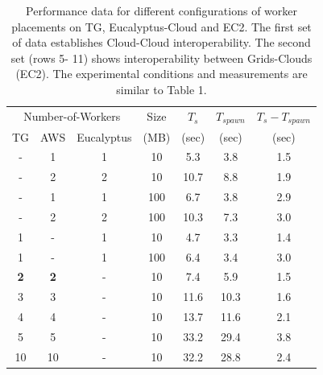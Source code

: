 \documentclass[3p,twocolumn]{elsarticle}
\newcommand{\upp}{\vspace*{-0.6em}}
\begin{document}
\begin{table}
\upp
\begin{tabular}{ccccccc}
  \hline
  \multicolumn{3}{c}{Number-of-Workers}  &  Size   &  $T_s$  & $T_{spawn}$ & $T_s - T_{spawn}$\\   
  TG &  AWS & Eucalyptus &  (MB)  & (sec) & (sec) & (sec) \\
  \hline
  - & 1 & 1 & 10   & 5.3 & 3.8 & 1.5\\
  - & 2 & 2 & 10   & 10.7 & 8.8 & 1.9 \\
  - & 1 & 1 & 100  & 6.7 & 3.8 & 2.9\\
  - & 2 & 2 & 100  & 10.3 & 7.3 & 3.0\\
  \hline 
  1 & - & 1 & 10   & 4.7 & 3.3 & 1.4\\
  1 & - & 1 & 100  & 6.4 & 3.4 & 3.0\\
  \hline 
  {\bf 2} &   {\bf 2} & - & 10 & 7.4 & 5.9 & 1.5 \\
  3 & 3 & - & 10 & 11.6 & 10.3 & 1.6 \\
  4 & 4 & - & 10 & 13.7 & 11.6 & 2.1 \\
  5 & 5 & - & 10 & 33.2 & 29.4 & 3.8 \\ 
  10 & 10 & - & 10 & 32.2 & 28.8 & 2.4 \\
  \hline
   \hline 
\end{tabular}
\upp
\caption{Performance data for different configurations of worker placements
  on TG, Eucalyptus-Cloud and EC2. The first set of data
  establishes Cloud-Cloud interoperability. The second set 
  (rows 5- 11) shows interoperability between Grids-Clouds (EC2). 
  The experimental conditions and measurements are similar to Table 1.\vspace*{-1em}}
\label{stuff-2}
\upp
\upp
\end{table}
\end{document}
